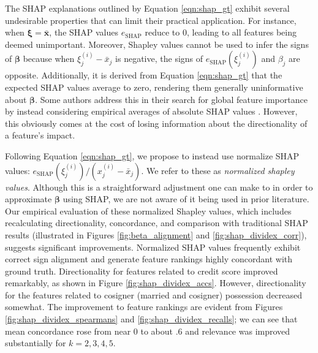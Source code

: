 \documentclass[mnsc,blindrev]{informs3}
\begin{document}
            
            
The SHAP explanations outlined by Equation \ref{eqn:shap_gt} exhibit several undesirable properties that can limit their practical application. For instance, when $\boldsymbol{\xi}=\bar{\mathbf{x}}$, the SHAP values $e_\text{SHAP}$ reduce to 0, leading to all features being deemed unimportant. Moreover, Shapley values cannot be used to infer the signs of $\boldsymbol{\beta}$ because when $\xi^{(i)}_j - \bar{x}_j$ is negative, the signs of $e_{\text{SHAP}}(\xi^{(i)}_j)$ and $\beta_j$ are opposite. Additionally, it is derived from Equation \ref{eqn:shap_gt} that the expected SHAP values average to zero, rendering them generally uninformative about $\boldsymbol{\beta}$. Some authors address this in their search for global feature importance by instead considering empirical averages of absolute SHAP values \cite{lenaers23rent,maeng23vr,guenther2023useful}. However, this obviously comes at the cost of losing information about the directionality of a feature's impact.

             Following Equation \ref{eqn:shap_gt}, we propose to instead use normalize SHAP values: $e_{\text{SHAP}}(\xi^{(i)}_j) / (x^{(i)}_j - \bar{x}_j)$. We refer to these as \emph{normalized shapley values}. Although this is a straightforward adjustment one can make to in order to approximate $\boldsymbol{\beta}$ using SHAP, we are not aware of it being used in prior literature.  Our empirical evaluation of these normalized Shapley values, which includes recalculating directionality, concordance, and comparison with traditional SHAP results (illustrated in Figures \ref{fig:beta_alignment} and \ref{fig:shap_dividex_corr}), suggests significant improvements. Normalized SHAP values frequently exhibit correct sign alignment and generate feature rankings highly concordant with ground truth. Directionality for features related to credit score improved remarkably, as shown in Figure \ref{fig:shap_dividex_accs}. However, directionality for the features related to cosigner (married and cosigner) possession decreased somewhat. The improvement to feature rankings are evident from Figures \ref{fig:shap_dividex_spearmans} and \ref{fig:shap_dividex_recalls}; we can see that mean concordance rose from near 0 to about .6 and relevance was improved substantially for $k=2,3,4,5$. 
             
\end{document}
